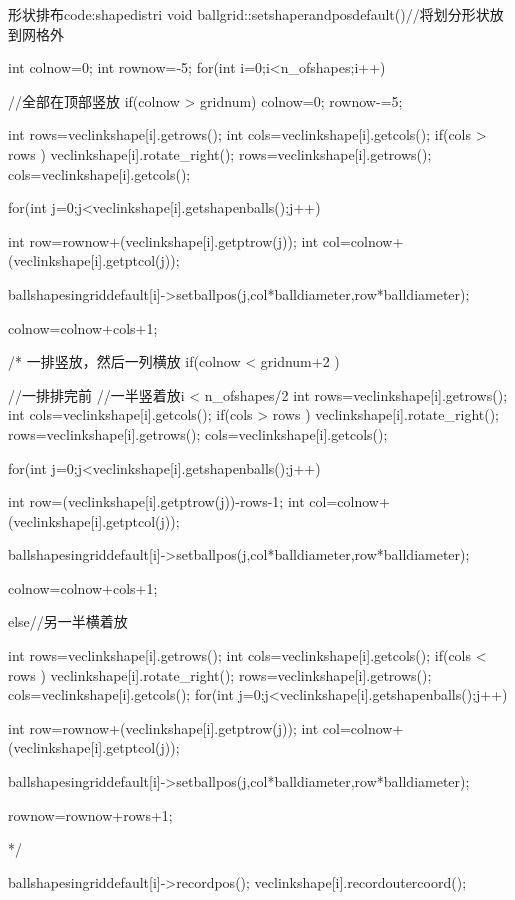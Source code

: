 \documentclass[11pt,twoside]{article} %
\begin{document}
\begin{codecpp}{形状排布}{code:shapedistri}
void ballgrid::setshaperandposdefault()//将划分形状放到网格外
{
    int colnow=0;
    int rownow=-5;
    for(int i=0;i<n_ofshapes;i++)
    {
        //全部在顶部竖放
        if(colnow > gridnum) {
            colnow=0;
            rownow-=5;
        }

        int rows=veclinkshape[i].getrows();
        int cols=veclinkshape[i].getcols();
        if(cols > rows )
        {
            veclinkshape[i].rotate_right();
            rows=veclinkshape[i].getrows();
            cols=veclinkshape[i].getcols();
        }

        for(int j=0;j<veclinkshape[i].getshapenballs();j++)
        {
            int row=rownow+(veclinkshape[i].getptrow(j));
            int col=colnow+(veclinkshape[i].getptcol(j));

           ballshapesingriddefault[i]->setballpos(j,col*balldiameter,row*balldiameter);
        }
        colnow=colnow+cols+1;

        /* 一排竖放，然后一列横放
        if(colnow < gridnum+2 ) {//一排排完前 //一半竖着放i < n_ofshapes/2
            int rows=veclinkshape[i].getrows();
            int cols=veclinkshape[i].getcols();
            if(cols > rows )
            {
                veclinkshape[i].rotate_right();
                rows=veclinkshape[i].getrows();
                cols=veclinkshape[i].getcols();
            }

            for(int j=0;j<veclinkshape[i].getshapenballs();j++)
            {
                int row=(veclinkshape[i].getptrow(j))-rows-1;
                int col=colnow+(veclinkshape[i].getptcol(j));

               ballshapesingriddefault[i]->setballpos(j,col*balldiameter,row*balldiameter);
            }
            colnow=colnow+cols+1;
        }
        else//另一半横着放
        {
            int rows=veclinkshape[i].getrows();
            int cols=veclinkshape[i].getcols();
            if(cols < rows )
            {
                veclinkshape[i].rotate_right();
                rows=veclinkshape[i].getrows();
                cols=veclinkshape[i].getcols();
            }
            for(int j=0;j<veclinkshape[i].getshapenballs();j++)
            {
                int row=rownow+(veclinkshape[i].getptrow(j));
                int col=colnow+(veclinkshape[i].getptcol(j));

               ballshapesingriddefault[i]->setballpos(j,col*balldiameter,row*balldiameter);
            }
            rownow=rownow+rows+1;
        }
        */

        ballshapesingriddefault[i]->recordpos();
        veclinkshape[i].recordoutercoord();
    }
}
\end{codecpp}
\end{document}

